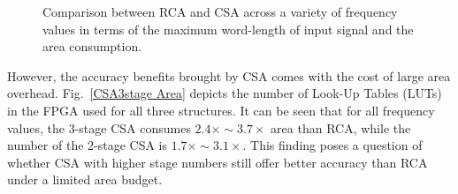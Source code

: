 \documentclass[journal]{IEEEtran}
\begin{document}
\begin{figure}[tbp]
    \begin{minipage}[b]{.48\textwidth}
        \centering
    \end{minipage}
    \centering
    \caption{Comparison between RCA and CSA across a variety of frequency values in terms of the maximum word-length of input signal and the area consumption.}
\end{figure}

However, the accuracy benefits brought by CSA comes with the cost of large area overhead. Fig.~\ref{CSA3stage Area} depicts the number of Look-Up Tables (LUTs) in the FPGA used for all three structures. It can be seen that for all frequency values, the 3-stage CSA consumes $2.4\times\sim3.7\times$ area than RCA, while the number of the 2-stage CSA is $1.7\times\sim3.1\times$. This finding poses a question of whether CSA with higher stage numbers still offer better accuracy than RCA under a limited area budget.
\end{document}
